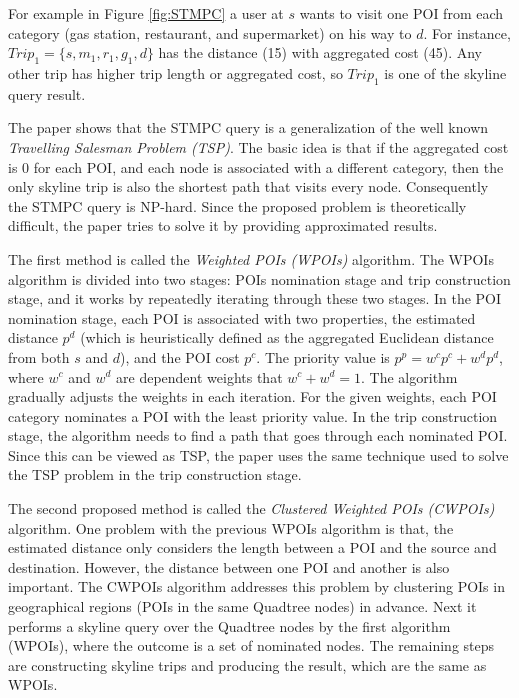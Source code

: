 \documentclass[paper=a4, fontsize=18pt]{article} %
\numberwithin{equation}{section} %
\numberwithin{figure}{section} %
\numberwithin{table}{section} %
\begin{document}
For example in Figure \ref{fig:STMPC} a user at $s$ wants to visit one POI from each category (gas station, restaurant, and supermarket) on his way to $d$. For instance, $Trip_1 = \{s,m_1,r_1,g_1,d\}$ has the distance (15) with aggregated cost (45). Any other trip has higher trip length or aggregated cost, so $Trip_1$ is one of the skyline query result.

The paper shows that the STMPC query is a generalization of the well known\emph{\emph{ Travelling Salesman Problem (TSP)}}. The basic idea is that if the aggregated cost is 0 for each POI, and each node is associated with a different category, then the only skyline trip is also the shortest path that visits every node. Consequently the STMPC query is NP-hard. Since the proposed problem is theoretically difficult, the paper tries to solve it by providing approximated results.

The first method is called the \emph{Weighted POIs (WPOIs)} algorithm. The WPOIs algorithm is divided into two stages: POIs nomination stage and trip construction stage, and it works by repeatedly iterating through these two stages. In the POI nomination stage, each POI is associated with two properties, the estimated distance $p^d$ (which is heuristically defined as the aggregated Euclidean distance from both $s$ and $d$), and the POI cost $p^c$. The priority value is $p^p = w^c p^c + w^d p^d$, where $w^c$ and $w^d$ are dependent weights that $w^c + w^d = 1$. The algorithm gradually adjusts the weights in each iteration. For the given weights, each POI category nominates a POI with the least priority value. In the trip construction stage, the algorithm needs to find a path that goes through each nominated POI. Since this can be viewed as TSP, the paper uses the same technique used to solve the TSP problem in the trip construction stage.

The second proposed method is called the \emph{Clustered Weighted POIs (CWPOIs)} algorithm. One problem with the previous WPOIs algorithm is that, the estimated distance only considers the length between a POI and the source and destination. However, the distance between one POI and another is also important. The CWPOIs algorithm addresses this problem by clustering POIs in geographical regions (POIs in the same Quadtree nodes) in advance. Next it performs a skyline query over the Quadtree nodes by the first algorithm (WPOIs), where the outcome is a set of nominated nodes. The remaining steps are constructing skyline trips and producing the result, which are the same as WPOIs.
\end{document}
